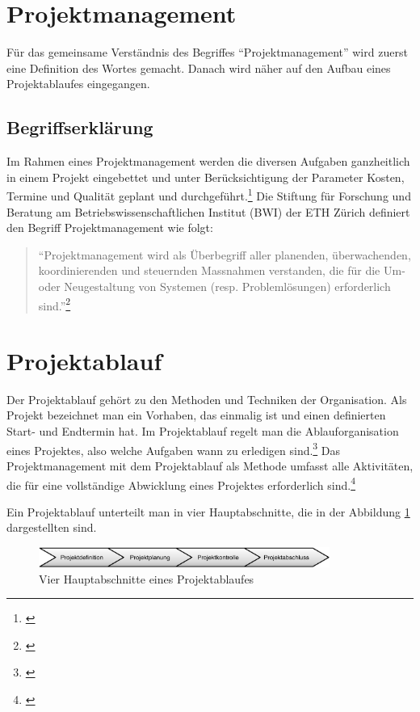 \section{Projektmanagement}
Für das gemeinsame Verständnis des Begriffes ``Projektmanagement'' wird zuerst
eine Definition des Wortes gemacht. Danach wird näher auf den Aufbau eines
Projektablaufes eingegangen.

\subsection{Begriffserklärung}
Im Rahmen eines Projektmanagement werden die diversen Aufgaben ganzheitlich in
einem Projekt eingebettet und unter Berücksichtigung der Parameter Kosten, Termine
und Qualität geplant und durchgeführt.\footnote{\citealp*[Vgl.][S. 9]{burghardt2007einfuehrung}}
Die Stiftung für Forschung und Beratung am Betriebswissenschaftlichen Institut 
(BWI) der ETH Zürich definiert den Begriff Projektmanagement wie folgt:

\begin{quote}
``Projektmanagement wird als Überbegriff aller planenden, überwachenden,
koordinierenden und steuernden Massnahmen verstanden, die für die Um- oder
Neugestaltung von Systemen (resp. Problemlösungen) erforderlich sind.''\footnote{\citealp*[S. 1.1]{stiftung1998projekt}}
\end{quote}

\section{Projektablauf}
Der Projektablauf gehört zu den Methoden und Techniken der Organisation. Als
Projekt bezeichnet man ein Vorhaben, das einmalig ist und einen definierten
Start- und Endtermin hat. Im Projektablauf regelt man die Ablauforganisation
eines Projektes, also welche Aufgaben wann zu erledigen sind.\footnote{\citealp*[Vgl.][S. 136]{schmidt2002einfuehrung}}
Das Projektmanagement mit dem Projektablauf als Methode umfasst alle Aktivitäten,
die für eine vollständige Abwicklung eines Projektes erforderlich sind.\footnote{\citealp*[Vgl.][S. 11]{burghardt2007einfuehrung}}

Ein Projektablauf unterteilt man in vier Hauptabschnitte, die in der Abbildung \ref{pic:01_hauptabschnitte}
dargestellten sind.

\begin{figure}[htbp]
\begin{center}
\includegraphics[width=0.85\textwidth,angle=0]{./bilder/theorie/01_hauptabschnitte.pdf}
\caption{Vier Hauptabschnitte eines Projektablaufes}
\label{pic:01_hauptabschnitte}
\end{center}
\end{figure}

